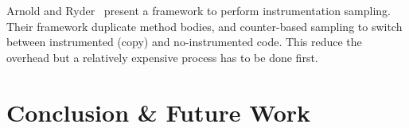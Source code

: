 \documentclass{sig-alternate}
\newcommand{\ra}{$\rightarrow$}
\newcommand{\chg}[2]{\textcolor{red}{\sout{#1}}{\ra}\textcolor{blue}{\uline{#2}}} %
\newcommand{\vp}[1]{\nb{Vanessa}{orange}{#1}}
\newcommand{\jp}[1]{\nb{Juan Pablo}{green}{#1}}
\newcommand{\seclabel}[1]{\label{sec:#1}}
\begin{document}

Arnold and Ryder~\cite{Arno01a} present a framework to perform instrumentation sampling. Their framework duplicate method bodies, and counter-based sampling to switch between instrumented (copy) and no-instrumented code. This reduce the overhead but a relatively expensive process has to be done first.







\section{Conclusion \& Future Work}\seclabel{conclusion}
\end{document}
